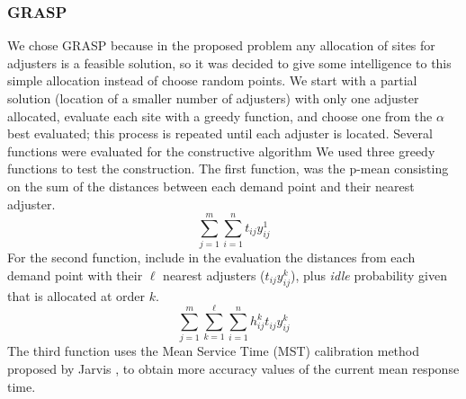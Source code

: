 \subsubsection{GRASP}
We chose GRASP
because
in the proposed problem
any allocation of sites for adjusters
is a feasible solution,
so it was decided to give some intelligence
to this simple allocation
instead of choose
random points.
We start with a partial solution
(location of a smaller number of adjusters)
with only one adjuster allocated,
evaluate each site with a greedy function,
and choose one from the $\alpha$ best evaluated;
this process is repeated
until each adjuster is located.
Several functions were evaluated
for the constructive algorithm
We used three greedy functions
to test the construction.
The first function,
was the p-mean
consisting
on the sum of the distances
between each demand point 
and their nearest adjuster.
\begin{equation}
  \label{eq:grasp1}
  \sum_{j=1}^{m}{
    \sum_{i=1}^{n}{
      t_{ij}y_{ij}^{1}
    }
  }
\end{equation}
For the second function,
include in the evaluation
the distances
from each demand point 
with their $\ell$ nearest adjusters
($t_{ij}y_{ij}^{k}$),
plus \textit{idle} probability
given that is allocated
at order $k$.
\begin{equation}
  \label{eq:grasp2}
  \sum_{j=1}^{m}{
    \sum_{k=1}^{\ell}{
      \sum_{i=1}^{n}{
        h_{ij}^{k}t_{ij}y_{ij}^{k}
      }
    }
  }
\end{equation}
The third function
uses the Mean Service Time (MST) calibration method
proposed by Jarvis \cite{jarvis1985approximating},
to obtain more accuracy values
of the current mean response time.
